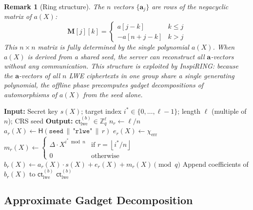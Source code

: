 \documentclass[11pt,a4paper]{article}
\newcommand{\Z}{\mathbb{Z}}
\newcommand{\floor}[1]{\left\lfloor #1 \right\rfloor}
\newtheorem{remark}{Remark}
\begin{document}
\begin{remark}[Ring structure]\label{rem:ring-struct}
The $n$ vectors $\{\mathbf{a}_j\}$ are rows of the \emph{negacyclic matrix} of $a(X)$:
\begin{equation}
    \mathbf{M}[j][k] = \begin{cases} a[j-k] & k \le j \\ -a[n+j-k] & k > j \end{cases}
    \label{eq:negacyclic-matrix}
\end{equation}
This $n \times n$ matrix is fully determined by the single polynomial $a(X)$.
When $a(X)$ is derived from a shared seed, the server can reconstruct all $\mathbf{a}$-vectors without any communication.
This structure is exploited by InspiRING: because the $\mathbf{a}$-vectors of all $n$ LWE ciphertexts in one group share a single generating polynomial, the offline phase precomputes gadget decompositions of automorphisms of $a(X)$ from the seed alone.
\end{remark}

\begin{algorithm}[H]
\caption{$\textsc{LWE.Enc}_b(s(X), i^*, \ell, \texttt{seed})$: Generate LWE $b$-values.}
\label{alg:lwe-enc-b}
\begin{algorithmic}[1]
\State \textbf{Input:} Secret key $s(X)$; target index $i^* \in \{0, \ldots, \ell\!-\!1\}$; length $\ell$ (multiple of $n$); CRS seed
\State \textbf{Output:} $\mathsf{ct}_{\mathrm{lwe}}^{(b)} \in \Z_q^{\ell}$ 
\State $n_r \gets \ell / n$
    \State $a_r(X) \gets \mathsf{H}(\texttt{seed} \,\|\, \texttt{"rlwe"} \,\|\, r)$ 
    \State $e_r(X) \gets \chi_{\mathrm{err}}$
    \State $m_r(X) \gets \begin{cases} \Delta \cdot X^{i^* \bmod n} & \text{if } r = \floor{i^*/n} \\ 0 & \text{otherwise}\end{cases}$
    \State $b_r(X) \gets a_r(X) \cdot s(X) + e_r(X) + m_r(X) \pmod{q}$
    \State Append coefficients of $b_r(X)$ to $\mathsf{ct}_{\mathrm{lwe}}^{(b)}$
\EndFor
\State \Return $\mathsf{ct}_{\mathrm{lwe}}^{(b)}$
\end{algorithmic}
\end{algorithm}

\subsection{Approximate Gadget Decomposition}\label{sec:gadget}
\end{document}
